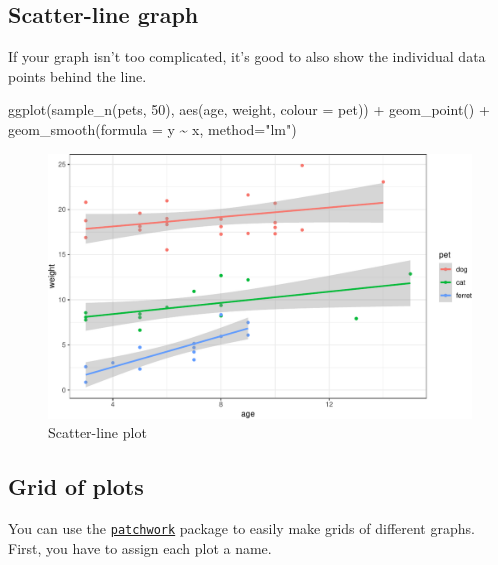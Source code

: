 \documentclass[
  oneside]{book}
\newenvironment{Shaded}{\begin{snugshade}}{\end{snugshade}}
\newcommand{\AttributeTok}[1]{\textcolor[rgb]{0.77,0.63,0.00}{#1}}
\newcommand{\DecValTok}[1]{\textcolor[rgb]{0.00,0.00,0.81}{#1}}
\newcommand{\FunctionTok}[1]{\textcolor[rgb]{0.00,0.00,0.00}{#1}}
\newcommand{\NormalTok}[1]{#1}
\newcommand{\SpecialCharTok}[1]{\textcolor[rgb]{0.00,0.00,0.00}{#1}}
\newcommand{\StringTok}[1]{\textcolor[rgb]{0.31,0.60,0.02}{#1}}
\begin{document}
\hypertarget{scatter-line-graph}{%
\subsection{Scatter-line graph}\label{scatter-line-graph}}

If your graph isn't too complicated, it's good to also show the individual data points behind the line.

\begin{Shaded}
\begin{Highlighting}[]
\FunctionTok{ggplot}\NormalTok{(}\FunctionTok{sample\_n}\NormalTok{(pets, }\DecValTok{50}\NormalTok{), }\FunctionTok{aes}\NormalTok{(age, weight, }\AttributeTok{colour =}\NormalTok{ pet)) }\SpecialCharTok{+}
  \FunctionTok{geom\_point}\NormalTok{() }\SpecialCharTok{+}
  \FunctionTok{geom\_smooth}\NormalTok{(}\AttributeTok{formula =}\NormalTok{ y }\SpecialCharTok{\textasciitilde{}}\NormalTok{ x, }\AttributeTok{method=}\StringTok{"lm"}\NormalTok{)}
\end{Highlighting}
\end{Shaded}

\begin{figure}

{\centering \includegraphics[width=0.9\linewidth]{images/scatter-line-1} 

}

\caption{Scatter-line plot}\label{fig:scatter-line}
\end{figure}

\hypertarget{plot_grid}{%
\subsection{Grid of plots}\label{plot_grid}}

You can use the \href{https://patchwork.data-imaginist.com/}{\texttt{patchwork}} package to easily make grids of different graphs. First, you have to assign each plot a name.
\end{document}
